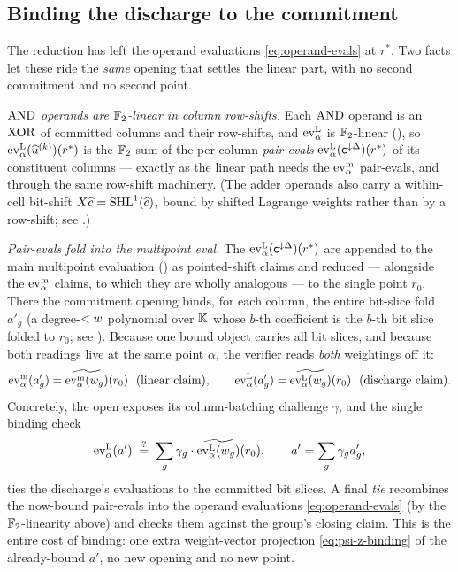 \subsection{Binding the discharge to the commitment}
\label{sec:had-binding}

The reduction has left the operand evaluations \eqref{eq:operand-evals} at
$r^*$. Two facts let these ride the \emph{same} opening that settles the linear
part, with no second commitment and no second point.

\emph{$\operatorname{AND}$ operands are $\mathbb{F}_2$-linear in column row-shifts.} Each $\operatorname{AND}$
operand is an $\operatorname{XOR}$ of committed columns and their row-shifts, and $\operatorname{ev}^{\mathrm{L}}_{\alpha}$
is $\mathbb{F}_2$-linear (), so $\operatorname{ev}^{\mathrm{L}}_{\alpha}(\widehat{u}^{(k)})(r^*)$ is
the $\mathbb{F}_2$-sum of the per-column \emph{pair-evals}
$\operatorname{ev}^{\mathrm{L}}_{\alpha}(\mathsf{c}^{\downarrow\Delta})(r^*)$ of its constituent columns ---
exactly as the linear path needs the $\operatorname{ev}^{\mathrm{m}}_{\alpha}$ pair-evals, and through the same
row-shift machinery. (The adder operands also carry a within-cell bit-shift
$X\widehat{c}=\operatorname{SHL}^{1}(\widehat{c})$, bound by shifted Lagrange weights rather than by a
row-shift; see .)

\emph{Pair-evals fold into the multipoint eval.} The
$\operatorname{ev}^{\mathrm{L}}_{\alpha}(\mathsf{c}^{\downarrow\Delta})(r^*)$ are appended to the main multipoint
evaluation () as pointed-shift claims and reduced ---
alongside the $\operatorname{ev}^{\mathrm{m}}_{\alpha}$ claims, to which they are wholly analogous --- to the
single point $r_0$. There the commitment opening binds, for each column, the
entire bit-slice fold $a'_g$ (a degree-$<w$ polynomial over $\mathbb{K}$ whose
$b$-th coefficient is the $b$-th bit slice folded to $r_0$; see
). Because one bound object carries all bit slices, and
because both readings live at the same point $\alpha$, the verifier reads
\emph{both} weightings off it:
\[
  \psia(a'_g) = \mle{\psia(w_g)}(r_0)\ \ (\text{linear claim}),
  \qquad
  \psiz(a'_g) = \mle{\psiz(w_g)}(r_0)\ \ (\text{discharge claim}).
\]
Concretely, the open exposes its column-batching challenge $\gamma$, and the
single binding check
\begin{equation}
  \label{eq:psi-z-binding}
  \operatorname{ev}^{\mathrm{L}}_{\alpha}(a') \;\stackrel{?}{=}\; \sum_{g} \gamma_g\cdot\widetilde{\operatorname{ev}^{\mathrm{L}}_{\alpha}(w_g)}(r_0),
  \qquad a' = \sum_g\gamma_g a'_g,
\end{equation}
ties the discharge's evaluations to the committed bit slices. A final
\emph{tie} recombines the now-bound pair-evals into the operand evaluations
\eqref{eq:operand-evals} (by the $\mathbb{F}_2$-linearity above) and checks them
against the group's closing claim. This is the entire cost of binding: one
extra weight-vector projection \eqref{eq:psi-z-binding} of the already-bound
$a'$, no new opening and no new point.

